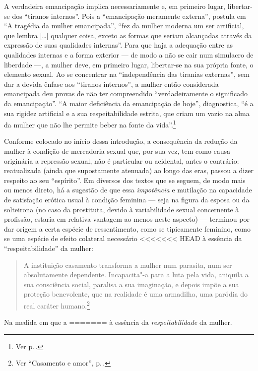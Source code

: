 A verdadeira emancipação implica necessariamente e, em primeiro lugar,
libertar-se dos ``tiranos internos''. Pois a ``emancipação meramente
externa'', postula em ``A tragédia da mulher emancipada'', ``fez da
mulher moderna um ser artificial, que lembra {[}\ldots{]} qualquer coisa,
exceto as formas que seriam alcançadas através da expressão de suas
qualidades internas''. Para que haja a adequação entre as qualidades
internas e a forma exterior --- de modo a não se cair num simulacro de
liberdade ---, a mulher deve, em primeiro lugar, libertar-se na sua
própria fonte, o elemento sexual. Ao se concentrar na ``independência
das tiranias externas'', sem dar a devida ênfase aos ``tiranos
internos'', a mulher então considerada emancipada deu
provas de não ter compreendido ``verdadeiramente o significado da
emancipação''. ``A maior deficiência da emancipação de hoje'',
diagnostica, ``é a sua rigidez artificial e a sua respeitabilidade
estrita, que criam um vazio na alma da mulher que não lhe permite beber
na fonte da vida''.\footnote{Ver p.\,\pageref{mae}.}

Conforme colocado no início dessa introdução, a consequência da
redução da mulher à condição de mercadoria sexual que, por sua vez, tem
como causa originária a repressão sexual, não é particular ou acidental,
antes o contrário: reatualizada (ainda que supostamente atenuada) ao
longo das eras, passou a dizer respeito ao seu ``espírito''. Em diversos
dos textos que se seguem, de modo mais ou menos direto, há a sugestão de
que essa \textit{impotência} e mutilação na capacidade de satisfação erótica
usual à condição feminina --- seja na figura da esposa ou da solteirona
(no caso da prostituta, devido à variabilidade sexual concernente à
profissão, estaria em relativa vantagem ao menos neste aspecto) ---
terminou por dar origem a certa espécie de ressentimento, como se
tipicamente feminino, como se uma espécie de efeito colateral necessário
<<<<<<< HEAD
à essência da ``respeitabilidade'' da mulher:

\begin{quote}
A instituição casamento transforma a mulher num parasita, num ser
absolutamente dependente. Incapacita"-a para a luta pela vida, aniquila a
sua consciência social, paralisa a sua imaginação, e depois impõe a sua
proteção benevolente, que na realidade é uma armadilha, uma paródia do
real caráter humano.\footnote{Ver ``Casamento e amor'', p.\,\pageref{parasita}.}
\end{quote}

Na medida em que a
=======
à essência da \textit{respeitabilidade} da mulher. 

